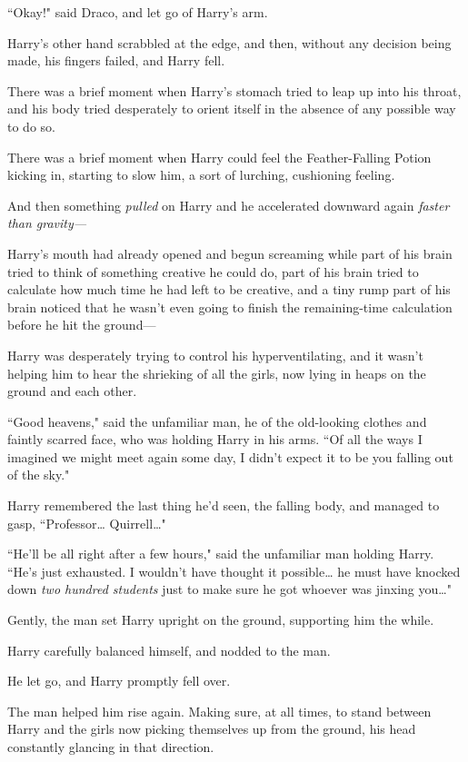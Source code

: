 ``Okay!" said Draco, and let go of Harry's arm.

Harry's other hand scrabbled at the edge, and then, without any decision being made, his fingers failed, and Harry fell.

There was a brief moment when Harry's stomach tried to leap up into his throat, and his body tried desperately to orient itself in the absence of any possible way to do so.

There was a brief moment when Harry could feel the Feather-Falling Potion kicking in, starting to slow him, a sort of lurching, cushioning feeling.

And then something \emph{pulled} on Harry and he accelerated downward again \emph{faster than gravity—}

Harry's mouth had already opened and begun screaming while part of his brain tried to think of something creative he could do, part of his brain tried to calculate how much time he had left to be creative, and a tiny rump part of his brain noticed that he wasn't even going to finish the remaining-time calculation before he hit the ground—

\later

Harry was desperately trying to control his hyperventilating, and it wasn't helping him to hear the shrieking of all the girls, now lying in heaps on the ground and each other.

``Good heavens," said the unfamiliar man, he of the old-looking clothes and faintly scarred face, who was holding Harry in his arms. ``Of all the ways I imagined we might meet again some day, I didn't expect it to be you falling out of the sky."

Harry remembered the last thing he'd seen, the falling body, and managed to gasp, ``Professor{\ldots} Quirrell{\ldots}"

``He'll be all right after a few hours," said the unfamiliar man holding Harry. ``He's just exhausted. I wouldn't have thought it possible{\ldots} he must have knocked down \emph{two hundred students} just to make sure he got whoever was jinxing you{\ldots}"

Gently, the man set Harry upright on the ground, supporting him the while.

Harry carefully balanced himself, and nodded to the man.

He let go, and Harry promptly fell over.

The man helped him rise again. Making sure, at all times, to stand between Harry and the girls now picking themselves up from the ground, his head constantly glancing in that direction.

